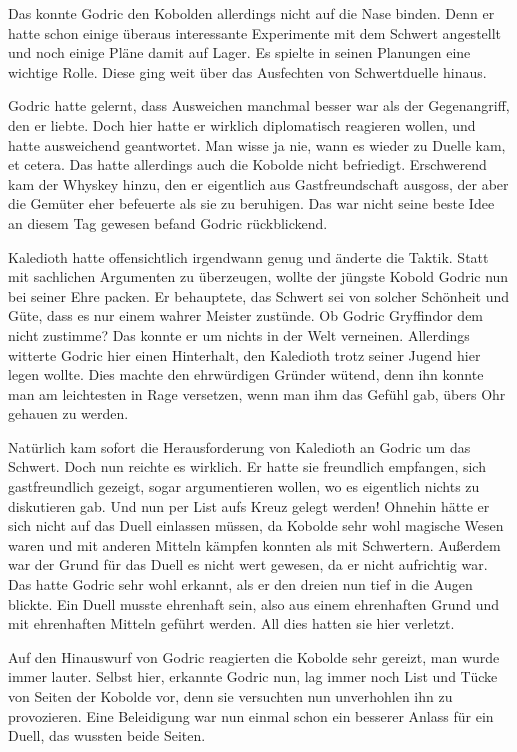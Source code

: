 \documentclass[fontsize=12pt]{scrartcl}
\begin{document}
	Das konnte Godric den Kobolden allerdings nicht auf die Nase binden. Denn er hatte schon einige überaus interessante Experimente mit dem Schwert angestellt und noch einige Pläne damit auf Lager. Es spielte in seinen Planungen eine wichtige Rolle. Diese ging weit über das Ausfechten von Schwertduelle hinaus. 
	
	Godric hatte gelernt, dass Ausweichen manchmal besser war als der Gegenangriff, den er liebte. Doch hier hatte er wirklich diplomatisch reagieren wollen, und hatte ausweichend geantwortet. Man wisse ja nie, wann es wieder zu Duelle kam, et cetera. Das hatte allerdings auch die Kobolde nicht befriedigt. Erschwerend kam der Whyskey hinzu, den er eigentlich aus Gastfreundschaft ausgoss, der aber die Gemüter eher befeuerte als sie zu beruhigen. Das war nicht seine beste Idee an diesem Tag gewesen befand Godric rückblickend. 
	
	Kaledioth hatte offensichtlich irgendwann genug und änderte die Taktik. Statt mit sachlichen Argumenten zu überzeugen, wollte der jüngste Kobold Godric nun bei seiner Ehre packen. Er behauptete, das Schwert sei von solcher Schönheit und Güte, dass es nur einem wahrer Meister zustünde. Ob Godric Gryffindor dem nicht zustimme? Das konnte er um nichts in der Welt verneinen. Allerdings witterte Godric hier einen Hinterhalt, den Kaledioth trotz seiner Jugend hier legen wollte. Dies machte den ehrwürdigen Gründer wütend, denn ihn konnte man am leichtesten in Rage versetzen, wenn man ihm das Gefühl gab, übers Ohr gehauen zu werden. 
	
	Natürlich kam sofort die Herausforderung von Kaledioth an Godric um das Schwert. Doch nun reichte es wirklich. Er hatte sie freundlich empfangen, sich gastfreundlich gezeigt, sogar argumentieren wollen, wo es eigentlich nichts zu diskutieren gab. Und nun per List aufs Kreuz gelegt werden! Ohnehin hätte er sich nicht auf das Duell einlassen müssen, da Kobolde sehr wohl magische Wesen waren und mit anderen Mitteln kämpfen konnten als mit Schwertern. Außerdem war der Grund für das Duell es nicht wert gewesen, da er nicht aufrichtig war. Das hatte Godric sehr wohl erkannt, als er den dreien nun tief in die Augen blickte. Ein Duell musste ehrenhaft sein, also aus einem ehrenhaften Grund und mit ehrenhaften Mitteln geführt werden. All dies hatten sie hier verletzt. 
	
	Auf den Hinauswurf von Godric reagierten die Kobolde sehr gereizt, man wurde immer lauter. Selbst hier, erkannte Godric nun, lag immer noch List und Tücke von Seiten der Kobolde vor, denn sie versuchten nun unverhohlen ihn zu provozieren. Eine Beleidigung war nun einmal schon ein besserer Anlass für ein Duell, das wussten beide Seiten. 
	
\end{document}
